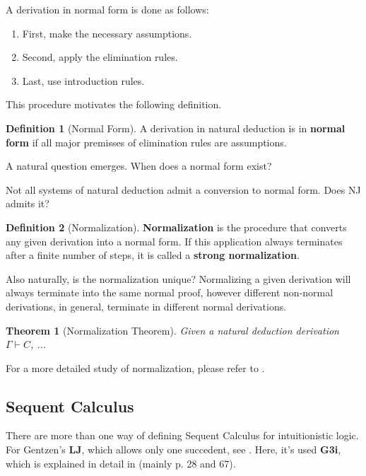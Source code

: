 \documentclass[12pt,a4paper]{article}
\newtheorem{theorem}{Theorem}[section]
\theoremstyle{definition}
\newtheorem{definition}{Definition}[section]
\begin{document}
A derivation in normal form is done as follows:
\begin{enumerate}
    \item First, make the necessary assumptions.
    \item Second, apply the elimination rules.
    \item Last, use introduction rules.
\end{enumerate}

This procedure motivates the following definition.

\begin{definition}[Normal Form]
    A derivation in natural deduction is in \textbf{normal form} if all major premisses of elimination rules are assumptions.
\end{definition}

A natural question emerges. When does a normal form exist? 

Not all systems of natural deduction admit a conversion to normal form. Does NJ admits it?

\begin{definition}[Normalization]
    \textbf{Normalization} is the procedure that converts any given derivation into a normal form. If this application always terminates after a finite number of steps, it is called a \textbf{strong normalization}.
\end{definition}

Also naturally, is the normalization unique? Normalizing a given derivation will always terminate into the same normal proof, however different non-normal derivations, in general, terminate in different normal derivations.

\begin{theorem}[Normalization Theorem]
    Given a natural deduction derivation $\Gamma \vdash C$, ...
\end{theorem}

For a more detailed study of normalization, please refer to \cite{negri2008structural}.

\subsection{Sequent Calculus}
\label{Sequent}

There are more than one way of defining Sequent Calculus for intuitionistic logic. For Gentzen's \textbf{LJ}, which allows only one succedent, see \cite{takeuti2013proof}. Here, it's used \textbf{G3i}, which is explained in detail in \cite{negri2008structural} (mainly p. 28 and 67).
\end{document}

